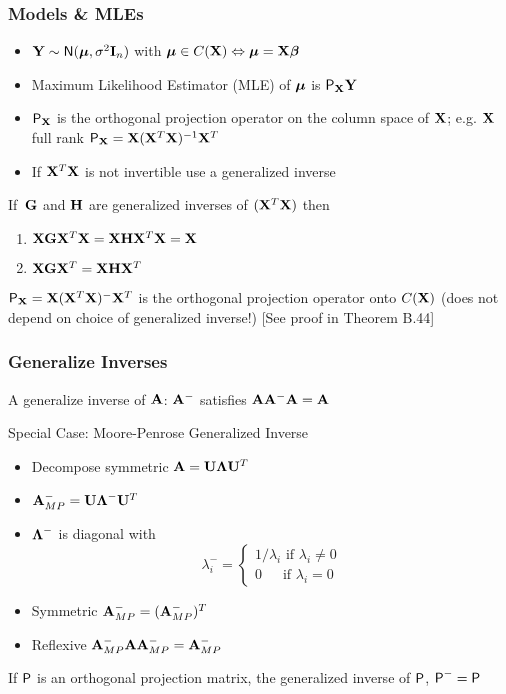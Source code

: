 \documentclass[handout]{beamer}
\begin{document}
\begin{frame} \frametitle{Models \& MLEs}
  \begin{itemize}
  \item   $\Y \sim \N(\mub, \sigma^2 \I_n)$ with $\mub \in C(\X)
    \Leftrightarrow \mub = \X \b$  \pause
  \item  Maximum Likelihood Estimator (MLE) of $\mub$ is
    $\P_\X \Y$  \pause
\item $\P_\X$ is the orthogonal projection operator on the column
  space of $\X$; e.g. $\X$ full rank $\P_\X = \X (\X^T\X)^{-1} \X^T$
  \pause
\item If $\X^T\X$ is not invertible use a generalized inverse
\end{itemize}
\begin{lemma}[B.43]
  If $\, \G$ and $\H$ are generalized inverses of $(\X^T\X)$ then
  \begin{enumerate}
  \item $\X \G \X^T \X = \X \H \X^T \X = \X$
  \item $\X \G \X^T = \X \H \X^T$
  \end{enumerate}
\end{lemma} \pause
$\P_\X = \X (\X^T\X)^{-} \X^T$ is the orthogonal projection operator
onto $C(\X)$   (does not depend on choice of generalized inverse!)
[See proof in Theorem B.44]
\end{frame}
\begin{frame}
  \frametitle{Generalize Inverses}

A generalize inverse of $\A$: $\A^{-}$ satisfies   $\A \A^- \A = \A$


Special Case: Moore-Penrose Generalized Inverse  \pause


\begin{itemize}
\item Decompose symmetric $\A = \U \Lambdab \U^T$  \pause
\item $\A^-_{MP} = \U \Lambdab^- \U^T$  \pause
\item $\Lambdab^-$ is diagonal with $$ \lambda_i^- = \left\{
    \begin{array}{l}
   1/\lambda_i \text{ if } \lambda_i \neq 0 \\
   0 \quad \, \text{  if } \lambda_i = 0
    \end{array}
\right.$$  \pause
\item Symmetric  $\A^-_{MP} = (\A^-_{MP})^T $  \pause
\item Reflexive  $\A^-_{MP}\A \A^-_{MP} = \A^-_{MP} $  \pause
\end{itemize}

If $\P$ is an orthogonal projection matrix, the generalized inverse of
$\P$, $\P^- = \P$ 


\end{frame}
\end{document}
